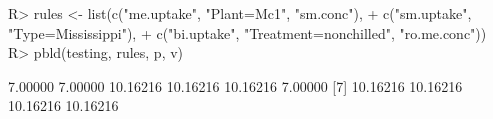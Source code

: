 \begin{Schunk}
% --begin: "pbld_custom"
\begin{Sinput}
R> rules <- list(c("me.uptake", "Plant=Mc1", "sm.conc"),
+                c("sm.uptake", "Type=Mississippi"),
+                c("bi.uptake", "Treatment=nonchilled", "ro.me.conc"))
R> pbld(testing, rules, p, v)
\end{Sinput}
\begin{Soutput}
 [1]  7.00000  7.00000 10.16216 10.16216 10.16216  7.00000
 [7] 10.16216 10.16216 10.16216 10.16216
\end{Soutput}
%
% --end: "pbld_custom"
\end{Schunk}
